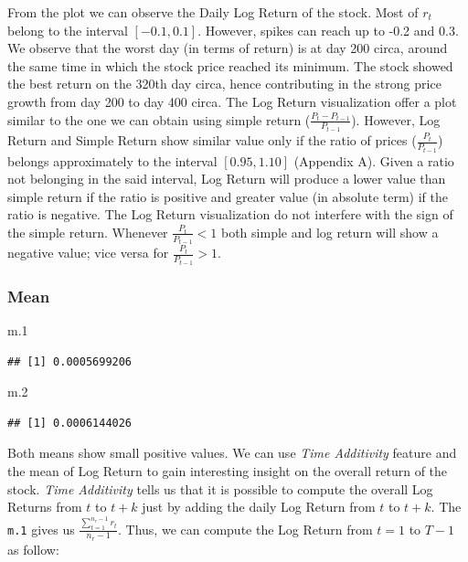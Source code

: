 \documentclass[
]{article}
\newenvironment{Shaded}{\begin{snugshade}}{\end{snugshade}}
\newcommand{\FloatTok}[1]{\textcolor[rgb]{0.00,0.00,0.81}{#1}}
\newcommand{\NormalTok}[1]{#1}
\begin{document}
From the plot we can observe the Daily Log Return of the stock. Most of
\(r_t\) belong to the interval \([-0.1, 0.1]\). However, spikes can
reach up to -0.2 and 0.3. We observe that the worst day (in terms of
return) is at day 200 circa, around the same time in which the stock
price reached its minimum. The stock showed the best return on the 320th
day circa, hence contributing in the strong price growth from day 200 to
day 400 circa. The Log Return visualization offer a plot similar to the
one we can obtain using simple return
(\(\frac{P_t - P_{t-1}}{P_{t-1}}\)). However, Log Return and Simple
Return show similar value only if the ratio of prices
(\(\frac{P_t}{P_{t-1}}\)) belongs approximately to the interval
\([0.95, 1.10]\) (Appendix A). Given a ratio not belonging in the said
interval, Log Return will produce a lower value than simple return if
the ratio is positive and greater value (in absolute term) if the ratio
is negative. The Log Return visualization do not interfere with the sign
of the simple return. Whenever \(\frac{P_t}{P_{t-1}} < 1\) both simple
and log return will show a negative value; vice versa for
\(\frac{P_t}{P_{t-1}} > 1\).

\hypertarget{mean}{%
\subsubsection{Mean}\label{mean}}

\begin{Shaded}
\begin{Highlighting}[]
\NormalTok{m}\FloatTok{.1}
\end{Highlighting}
\end{Shaded}

\begin{verbatim}
## [1] 0.0005699206
\end{verbatim}

\begin{Shaded}
\begin{Highlighting}[]
\NormalTok{m}\FloatTok{.2}
\end{Highlighting}
\end{Shaded}

\begin{verbatim}
## [1] 0.0006144026
\end{verbatim}

Both means show small positive values. We can use
\textit{Time Additivity} feature and the mean of Log Return to gain
interesting insight on the overall return of the stock.
\textit{Time Additivity} tells us that it is possible to compute the
overall Log Returns from \(t\) to \(t+k\) just by adding the daily Log
Return from \(t\) to \(t+k\). The \texttt{m.1} gives us
\(\frac{\sum_{t=1}^{n_r-1} r_t}{n_r-1}\). Thus, we can compute the Log
Return from \(t=1\) to \(T-1\) as follow:
\end{document}
